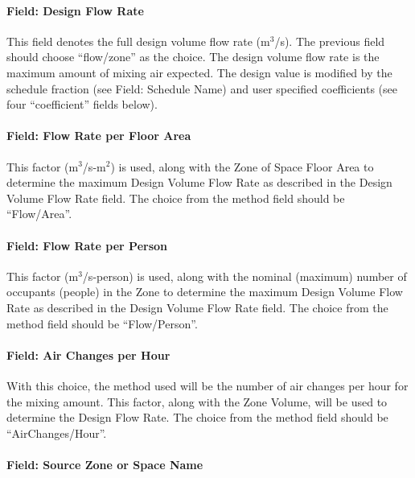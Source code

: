 \paragraph{Field: Design Flow Rate}\label{field-design-flow-rate-2}

This field denotes the full design volume flow rate (m\(^{3}\)/s). The previous field should choose ``flow/zone'' as the choice. The design volume flow rate is the maximum amount of mixing air expected. The design value is modified by the schedule fraction (see Field: Schedule Name) and user specified coefficients (see four ``coefficient'' fields below).

\paragraph{Field: Flow Rate per Floor Area}\label{field-flow-rate-per-zone-floor-area-1}

This factor (m\(^{3}\)/s-m\(^{2}\)) is used, along with the Zone of Space Floor  Area to determine the maximum Design Volume Flow Rate as described in the Design Volume Flow Rate field. The choice from the method field should be ``Flow/Area''.

\paragraph{Field: Flow Rate per Person}\label{field-flow-rate-per-person-1}

This factor (m\(^{3}\)/s-person) is used, along with the nominal (maximum) number of occupants (people) in the Zone to determine the maximum Design Volume Flow Rate as described in the Design Volume Flow Rate field. The choice from the method field should be ``Flow/Person''.

\paragraph{Field: Air Changes per Hour}\label{field-air-changes-per-hour-2}

With this choice, the method used will be the number of air changes per hour for the mixing amount. This factor, along with the Zone Volume, will be used to determine the Design Flow Rate. The choice from the method field should be ``AirChanges/Hour''.

\paragraph{Field: Source Zone or Space Name}\label{field-source-zone-name}

